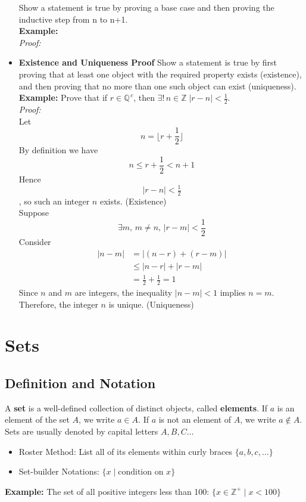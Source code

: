\documentclass[11pt]{article}
\begin{document}
\begin{itemize}
        Show a statement is true by proving a base case and then proving the inductive step from n to n+1.\\[.5em]
        \textbf{Example:}\\
        \textit{Proof:}\\
    \item\textbf{Existence and Uniqueness Proof}
        Show a statement is true by first proving that at least one object with the required property exists (existence), and then proving that no more than one such object can exist (uniqueness).\\[.5em]
        \textbf{Example:} Prove that if $\displaystyle r \in \mathbb{Q}^{\,c}$, then $\displaystyle\exists !\, n \in \mathbb{Z} \;|r-n| < \frac{1}{2}$.\\
        \textit{Proof:}\\
        Let 
        \[
            n = \lfloor r + \frac{1}{2} \rfloor
        \]
        By definition we have
        \[
            n \leq r + \frac{1}{2}< n + 1
        \]
        Hence \[|r-n| < \tfrac{1}{2}\], so such an integer $n$ exists. (Existence)\\
        Suppose
        \[
            \exists m,\, m\neq n,\,|r-m|<\frac{1}{2}
        \]
        Consider
        \begin{align*} 
            |n-m| &= |(n-r)+(r-m)|\\
            &\leq|n-r| + |r-m|\\
            &=\frac{1}{2}+\frac{1}{2}=1
        \end{align*}
        Since $n$ and $m$ are integers, the inequality $|n-m| < 1$ implies $n = m$. Therefore, the integer $n$ is unique. (Uniqueness)
\end{itemize}
\section{Sets}
\subsection{Definition and Notation}
A \textbf{set} is a well-defined collection of distinct objects, called \textbf{elements}.  
If $a$ is an element of the set $A$, we write $a \in A$. If $a$ is not an element of $A$, we write $a \notin A$.
Sets are usually denoted by capital letters $A, B, C \dots$
\begin{itemize}
    \item Roster Method: List all of its elements within curly braces $\{a, b, c, \dots\}$
    \item Set-builder Notations: $\{x \mid \text{condition on }x \}$
\end{itemize}
\textbf{Example:} The set of all positive integers less than 100: $\{x\in \mathbb{Z}^+ \mid x < 100\}$
\end{document}
